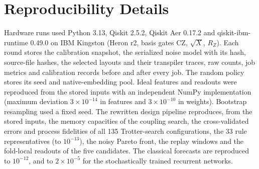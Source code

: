 \documentclass[journal]{IEEEtran}
\begin{document}
\section{Reproducibility Details}
Hardware runs used Python 3.13, Qiskit 2.5.2, Qiskit Aer 0.17.2 and qiskit-ibm-runtime 0.49.0 on IBM Kingston (Heron r2, basis gates CZ, $\sqrt{X}$, $R_Z$). Each round stores the calibration snapshot, the serialized noise model with its hash, source-file hashes, the selected layouts and their transpiler traces, raw counts, job metrics and calibration records before and after every job. The random policy stores its seed and native-embedding pool. Ideal features and readouts were reproduced from the stored inputs with an independent NumPy implementation (maximum deviation $3\times10^{-14}$ in features and $3\times10^{-10}$ in weights). Bootstrap resampling used a fixed seed. The rewritten design pipeline reproduces, from the stored inputs, the memory capacities of the coupling search, the cross-validated errors and process fidelities of all 135 Trotter-search configurations, the 33 rule representatives (to $10^{-13}$), the noisy Pareto front, the replay windows and the fold-local readouts of the five candidates. The classical forecasts are reproduced to $10^{-12}$, and to $2\times10^{-5}$ for the stochastically trained recurrent networks.
\end{document}
